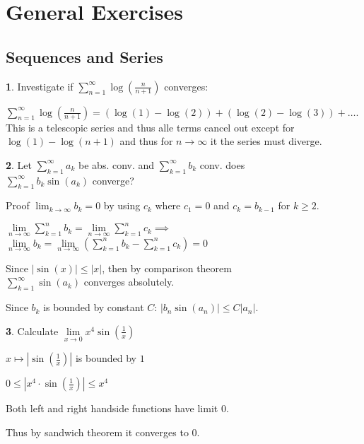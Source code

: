 \documentclass[a4paper, 10pt]{article}
\theoremstyle{definition}
\theoremstyle{ex}
\newtheorem*{exercise}{}
\theoremstyle{named}
\begin{document}
\section*{General Exercises}
\subsection*{Sequences and Series}
\begin{exercise}
    Investigate if $\sum_{n=1}^\infty \log(\frac{n}{n+1})$ converges:
    \begin{exanswers}
        \item $\sum_{n=1}^\infty \log(\frac{n}{n+1}) = (\log(1) - \log(2)) + (\log(2) - \log(3)) + \ldots$. This is a telescopic series and thus alle terms cancel out except for $\log(1) - \log(n + 1)$ and thus for $n \to \infty$ it the series must diverge. 
    \end{exanswers}
\end{exercise}

\begin{exercise}
    Let $\sum_{k = 1}^\infty a_k$ be abs. conv. and $\sum_{k=1}^\infty b_k$ conv. does \\
    $\sum_{k = 1}^\infty b_k \sin(a_k)$ converge?
    \begin{exanswers}
        \item Proof $\lim_{k \to \infty } b_k = 0$ by using $c_k$ where $c_1 = 0$ and $c_k = b_{k-1}$ for $k \geq 2$.
        \item $\lim\limits_{n\to\infty} \sum\limits_{k=1}^n b_k = \lim\limits_{n\to\infty} \sum\limits_{k=1}^n c_k \implies $ \\
        $\lim\limits_{n\to\infty} b_k = \lim\limits_{n\to\infty} (\sum\limits_{k=1}^n b_k - \sum\limits_{k=1}^n c_k) = 0$
        \item Since $|\sin(x)| \leq |x|$, then by comparison theorem \\ 
        $\sum_{k=1}^\infty \sin(a_k)$ converges absolutely.
        \item Since $b_k$ is bounded by constant $C$: $|b_n \sin(a_n)| \leq C|a_n|$.
    \end{exanswers}
\end{exercise}

\begin{exercise}
    Calculate $\lim\limits_{x \to 0} x^4 \sin(\frac{1}{x})$
    \begin{exanswers}
        \item $x \mapsto |\sin(\frac{1}{x})|$ is bounded by $1$
        \item $0 \leq |x^4\cdot\sin(\frac{1}{x})| \leq x^4$
        \item Both left and right handside functions have limit 0.
        \item Thus by sandwich theorem it converges to 0.
    \end{exanswers}
\end{exercise}
\end{document}
